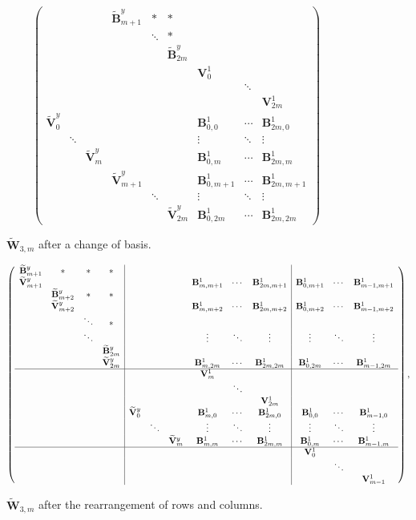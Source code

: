 \documentclass[12pt, letterpaper]{amsart}
\theoremstyle{definition}
\newcommand{\bB}{\mathbf{B} }
\newcommand{\bV}{\mathbf{V} }
\newcommand{\bW}{\mathbf{W} }
\begin{document}
\begin{figure}[!ht]
{\small
\[
\left(\begin{smallmatrix}
  &&&\widetilde{\bB}_{m+1}^y&*&*\\
  &&&&\ddots&*\\
  &&&&&\widetilde{\bB}_{2m}^y\\
  &&&&&&\bV_0^1\\
  &&&&&&&\ddots\\
  &&&&&&&&\bV_{2m}^1\\
  \widetilde{\bV}_{0}^y&&&&&&\bB^1_{0,0}&\cdots&\bB^1_{2m,0}\\
  &\ddots&&&&&\vdots&\ddots&\vdots\\
  &&\widetilde{\bV}_m^y&&&&\bB^1_{0,m}&\cdots&\bB^1_{2m,m}\\
  &&&\widetilde{\bV}_{m+1}^y&&&\bB^1_{0,m+1}&\cdots&\bB^1_{2m,m+1}\\
  &&&&\ddots&&\vdots&\ddots&\vdots\\
  &&&&&\widetilde{\bV}_{2m}^y&\bB^1_{0,2m}&\cdots&\bB^1_{2m,2m}
\end{smallmatrix}\right)
\]
} \caption{\(\widetilde{\bW}_{3,m}\) after a change of basis.} \label{fig:afterchangeofbasis}
\end{figure}

\begin{figure}[!ht]
{\scriptsize
\[
\left(\begin{array}{cccc|cccccc|ccc}
  \widetilde{\bB}_{m+1}^y&*&*&* &&&&&&&\\
  \widetilde{\bV}_{m+1}^y&&&&&&&\bB_{m,m+1}^1&\cdots&\bB_{2m,m+1}^1&\bB_{0,m+1}^1&\cdots&\bB_{m-1,m+1}^1\\
  &\widetilde{\bB}_{m+2}^y&*&*&&&&&&\\
  &\widetilde{\bV}_{m+2}^y&&&&&&\bB_{m,m+2}^1&\cdots&\bB_{2m,m+2}^1&\bB_{0,m+2}^1&\cdots&\bB_{m-1,m+2}^1\\
  &&\ddots&*&&&&&&\\
  &&\ddots&&&&&\vdots&\ddots&\vdots&\vdots&\ddots&\vdots\\
  &&&\widetilde{\bB}_{2m}^y&&&&&&&\\
  &&&\widetilde{\bV}_{2m}^y&&&&\bB_{m,2m}^1&\cdots&\bB_{2m,2m}^1&\bB_{0,2m}^1&\cdots&\bB_{m-1,2m}^1\\
  \hline &&&&&&&\bV_{m}^1&&&\\
  &&&&&&&&\ddots&&&\\
  &&&&&&&&&\bV_{2m}^1\\
  &&&&\widetilde{\bV}_{0}^y&&&\bB_{m,0}^1&\cdots&\bB_{2m,0}^1&\bB_{0,0}^1&\cdots&\bB_{m-1,0}^1\\
  &&&&&\ddots&&\vdots&\ddots&\vdots&\vdots&\ddots&\vdots\\
  &&&&&&\widetilde{\bV}_{m}^y&\bB_{m,m}^1&\cdots&\bB_{2m,m}^1&\bB_{0,m}^1&\cdots&\bB_{m-1,m}^1\\
  \hline &&&&&&&&&&\bV_0^1\\
  &&&&&&&&&&&\ddots\\
  &&&&&&&&&&&&\bV_{m-1}^1
\end{array}\right),
\]
} \caption{\(\widetilde{\bW}_{3,m}\) after the rearrangement of rows and columns.} \label{fig:rearrangement}
\end{figure}
\end{document}
